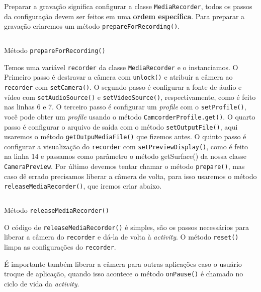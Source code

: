 \documentclass[a4paper,12pt,brazil,oneside]{book}
\begin{document}
\begin{singlespace}
		Preparar a gravação significa configurar a classe \texttt{MediaRecorder}, todos os passos da configuração devem ser feitos em uma \textbf{ordem específica}. Para preparar a gravação criaremos um método \texttt{prepareForRecording()}.

		\begin{listing}[H]
		\inputminted[linenos=true,fontsize=\small,frame=lines, framesep=2mm, tabsize=2,numbersep=5pt]{java}{src/api/camera/prepareVideo.java}
		\caption{Método \texttt{prepareForRecording()}}
		\label{code:preparevideo}
		\end{listing} 			

		Temos uma variável \texttt{recorder} da classe \texttt{MediaRecorder} e o instanciamos. O Primeiro passo é destravar a câmera com \texttt{unlock()} e atribuir a câmera ao \texttt{recorder} com \texttt{setCamera()}. O segundo passo é configurar a fonte de áudio e vídeo com \texttt{setAudioSource()} e \texttt{setVideoSource()}, respectivamente, como é feito nas linhas 6 e 7. O terceiro passo é configurar um \emph{profile} com o \texttt{setProfile()}, você pode obter um \emph{profile} usando o método \texttt{CamcorderProfile.get()}. O quarto passo é configurar o arquivo de saída com o método \texttt{setOutputFile()}, aqui usaremos o método \texttt{getOutpuMediaFile()} que fizemos antes. O quinto passo é configurar a visualização do \texttt{recorder} com \texttt{setPreviewDisplay()}, como é feito na linha 14 e passamos como parâmetro o método getSurface() da nossa classe \texttt{CameraPreview}. Por último devemos tentar chamar o método \texttt{prepare()}, mas caso dê errado precisamos liberar a câmera de volta, para isso usaremos o método \\ \texttt{releaseMediaRecorder()}, que iremos criar abaixo.

		\begin{listing}[H]
		\inputminted[linenos=true,fontsize=\small,frame=lines, framesep=2mm, tabsize=2,numbersep=5pt]{java}{src/api/camera/releaseRecorder.java}
		\caption{Método \texttt{releaseMediaRecorder()}}
		\label{code:releaserecorder}
		\end{listing} 			

		O código de \texttt{releaseMediaRecorder()} é simples, são os passos necessários para liberar a câmera do \texttt{recorder} e dá-la de volta à \emph{activity}.  O método \texttt{reset()} limpa as configurações do \texttt{recorder}.

		É importante também liberar a câmera para outras aplicações caso o usuário troque de aplicação, quando isso acontece o método \texttt{onPause()} é chamado no ciclo de vida da \emph{activity}.


\end{singlespace}
\end{document}
